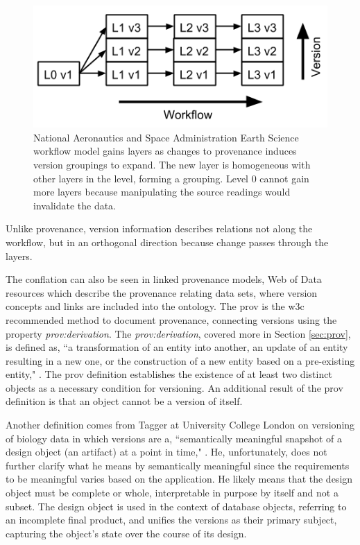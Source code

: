 \begin{figure}
	\centering
	\includegraphics[scale=1]{figures/VersionLayerDiagram2.png}
	\caption[Versions Layered on the National Aeronautics and Space Administration Earth Science workflow model]{National Aeronautics and Space Administration Earth Science workflow model gains layers as changes to provenance induces version groupings to expand.  The new layer is homogeneous with other layers in the level, forming a grouping.  Level 0 cannot gain more layers because manipulating the source readings would invalidate the data.}
	\label{NASALayers}
\end{figure}
Unlike provenance, version information describes relations not along the workflow, but in an orthogonal direction because change passes through the layers.

The conflation can also be seen in \gls{linked} provenance models, Web of Data resources which describe the \gls{provenance} relating data sets, where version concepts and links are included into the ontology.
The \gls{prov} is the \gls{w3c} recommended method to document \gls{provenance}, connecting versions using the property \textit{prov:derivation}.
The \textit{prov:derivation}, covered more in Section \ref{sec:prov}, is defined as, ``a transformation of an entity into another, an update of an entity resulting in a new one, or the construction of a new entity based on a pre-existing entity," \cite{Lebo2013}.
The \gls{prov} definition establishes the existence of at least two distinct objects as a necessary condition for versioning.
An additional result of the \gls{prov} definition is that an object cannot be a version of itself.

Another definition comes from Tagger at University College London on versioning of biology data in which versions are a, ``semantically meaningful snapshot of a design object (an artifact) at a point in time," \cite{Tagger2005}.
He, unfortunately, does not further clarify what he means by semantically meaningful since the requirements to be meaningful varies based on the application.
He likely means that the design object must be complete or whole, interpretable in purpose by itself and not a subset.
The design object is used in the context of database objects, referring to an incomplete final product, and unifies the versions as their primary subject, capturing the object's state over the course of its design.

